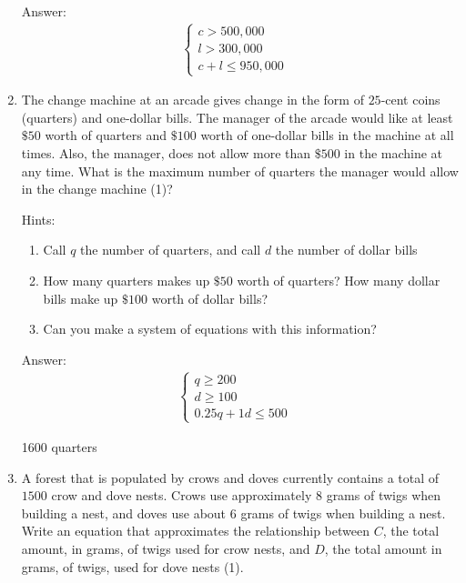 \documentclass{article}
\begin{document}
\begin{enumerate}
{	      Answer:
	      \[
		      \begin{array}{l}
			      \begin{cases}
				      c>500,000 & \\
				      l>300,000 & \\
				      c+l\leq950,000
			      \end{cases}
		      \end{array}
	      \]
	      }

	\item{The change machine at an arcade gives change in the form of $25$-cent coins (quarters) and one-dollar bills. The manager of the arcade would like at least $\$50$ worth of quarters and $\$100$ worth of one-dollar bills in the machine at all times. Also, the manager, does not allow more than $\$500$ in the machine at any time. What is the maximum number of quarters the manager would allow in the change machine (1)?

	      Hints:
	      \begin{enumerate}
		      \item{Call $q$ the number of quarters, and call $d$ the number of dollar bills}
		      \item{How many quarters makes up $\$50$ worth of quarters? How many dollar bills make up $\$100$ worth of dollar bills?}
		      \item{Can you make a system of equations with this information?}
	      \end{enumerate}

	      Answer:
	      \[
		      \begin{array}{l}
			      \begin{cases}
				      q \geq 200 & \\
				      d \geq 100 & \\
				      0.25q + 1d \leq 500
			      \end{cases}
		      \end{array}
	      \]

	      1600 quarters
	      }

	\item{A forest that is populated by crows and doves currently contains a total of $1500$ crow and dove nests. Crows use approximately $8$ grams of twigs when building a nest, and doves use about $6$ grams of twigs when building a nest. Write an equation that approximates the relationship between $C$, the total amount, in grams, of twigs used for crow nests, and $D$, the total amount in grams, of twigs, used for dove nests (1).

}
\end{enumerate}
\end{document}

